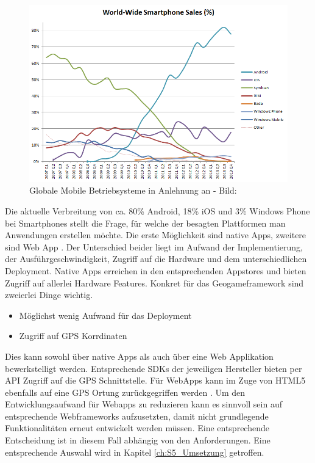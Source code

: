 \begin{figure}[H]
\begin{center}
\includegraphics[width=140mm]{images/ch4_img02_marketshare.png}
\caption{Globale Mobile Betriebsysteme in Anlehnung an \textcite{Gartner.2013} - Bild: \cite{Wikipedia.2014}}
\label{img:ch4_img02_marketshare}
\end{center}
\end{figure}

Die aktuelle Verbreitung von ca. 80\% Android, 18\% iOS und 3\% Windows Phone bei Smartphones stellt die Frage, für welche der besagten Plattformen man Anwendungen erstellen möchte.
Die erste Möglichkeit sind native Apps, zweitere sind Web App \cite{Charland.2011}.
Der Unterschied beider liegt im Aufwand der Implementierung, der Ausführgeschwindigkeit, Zugriff auf die Hardware und dem unterschiedlichen Deployment.
Native Apps erreichen in den entsprechenden Appstores und bieten Zugriff auf allerlei Hardware Features.
Konkret für das Geogameframework sind zweierlei Dinge wichtig.

\begin{itemize}
\item Möglichst wenig Aufwand für das Deployment
\item Zugriff auf GPS Korrdinaten
\end{itemize}

Dies kann sowohl über native  Apps als auch über eine Web Applikation bewerkstelligt werden. Entsprechende SDKs der jeweiligen Hersteller bieten per API Zugriff auf die GPS Schnittstelle. Für WebApps kann im Zuge von HTML5 ebenfalls auf eine GPS Ortung zurückgegriffen werden \cite{Holdener.2011}. Um den Entwicklungsaufwand für Webapps zu reduzieren kann es sinnvoll sein auf entsprechende Webframeworks aufzusetzten, damit nicht grundlegende Funktionalitäten erneut entwickelt werden müssen.
Eine entsprechende Entscheidung ist in diesem Fall abhängig von den Anforderungen. Eine entsprechende Auswahl wird in Kapitel \ref{ch:S5_Umsetzung} getroffen.

